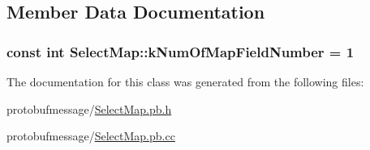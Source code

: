\subsection{Member Data Documentation}
\hypertarget{class_select_map_a82d1599ce39896be4446fdc47fd087b4}{
\subsubsection[{k\-Num\-Of\-Map\-Field\-Number}]{\setlength{\rightskip}{0pt plus 5cm}const int Select\-Map\-::k\-Num\-Of\-Map\-Field\-Number = 1\hspace{0.3cm}{\ttfamily [static]}}}\label{class_select_map_a82d1599ce39896be4446fdc47fd087b4}


The documentation for this class was generated from the following files\-:\begin{DoxyCompactItemize}
\item 
protobufmessage/\hyperlink{_select_map_8pb_8h}{Select\-Map.\-pb.\-h}\item 
protobufmessage/\hyperlink{_select_map_8pb_8cc}{Select\-Map.\-pb.\-cc}\end{DoxyCompactItemize}
